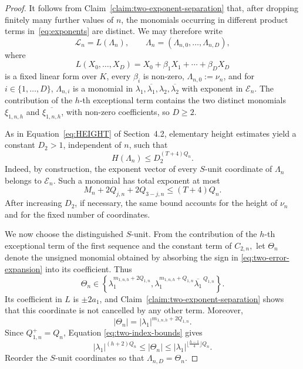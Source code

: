 \documentclass[a4paper,UKenglish,cleveref, autoref, thm-restate]{lipics-v2021}
\begin{document}
\begin{proof}
It follows from Claim~\ref{claim:two-exponent-separation} that, after dropping finitely many further
values of \(n\), the monomials occurring in different product terms in~\eqref{eq:exponents} are distinct. We may therefore
write
\begin{equation}\label{eq:two-linear-form}
  \mathcal L_n=L(\Lambda_n),
  \qquad
  \Lambda_n=(\Lambda_{n,0},\ldots,\Lambda_{n,D}),
\end{equation}
where
\[
  L(X_0,\ldots,X_D)
  =
  X_0+\beta_1X_1+\cdots+\beta_DX_D
\]
is a fixed linear form over \(K\), every \(\beta_i\) is non-zero, \(\Lambda_{n,0}:=\nu_n\), and
for $i\in\{1,\ldots,D\}$, \(\Lambda_{n,i}\) is a monomial in
\(
  \lambda_1,\overline{\lambda_1},
  \lambda_2,\overline{\lambda_2}
\)
with exponent in $\mathcal E_n$.
The contribution of the $h$-th exceptional term contains the two
distinct monomials $\xi_{1,n,h}$ and
$\overline{\xi_{1,n,h}}$, with non-zero coefficients, so $D\geq 2$.


As in Equation~\eqref{eq:HEIGHT} of Section~4.2, elementary height estimates yield a
constant \(D_2>1\), independent of \(n\), such that
\begin{equation}\label{eq:two-height-estimate}
  H(\Lambda_n)
  \le
  D_2^{(T+4)Q_n}.
\end{equation}
Indeed, by construction, the exponent vector of every $S$-unit
coordinate of $\Lambda_n$ belongs to $\mathcal E_n$.  Such a monomial has total exponent at most 
\[
  M_n+2Q_{j,n}+2Q_{3-j,n}
  \le
  (T+4)Q_n.
\]
After increasing \(D_2\), if necessary, the same bound accounts for
the height of \(\nu_n\) and for the fixed number of coordinates.

We now choose the distinguished \(S\)-unit. From the contribution of
the \(h\)-th exceptional term of the first sequence and the constant
term of
\(C_{2,n},
\)
let \(\Theta_n\) denote the unsigned monomial obtained by absorbing the
sign in \eqref{eq:two-error-expansion} into its coefficient. Thus
\begin{equation}\label{eq:two-theta-type}
  \Theta_n
  \in
  \left\{
    \lambda_1^{m_{1,n,h}+2Q_{1,n}},
    \lambda_1^{m_{1,n,h}+Q_{1,n}}
    \overline{\lambda_1}^{\,Q_{1,n}}
  \right\}.
\end{equation}
Its coefficient in \(L\) is \(\pm2a_1\), and Claim~\ref{claim:two-exponent-separation}
shows that this coordinate is not cancelled by any other term.
Moreover,
\[
  |\Theta_n|
  =
  |\lambda_1|^{m_{1,n,h}+2Q_{1,n}}.
\]
Since \(Q_{1,n}^+=Q_n\), Equation
\eqref{eq:two-index-bounds}  gives
\begin{equation}\label{eq:two-theta-bounds}
  |\lambda_1|^{(h+2)Q_n}
  \le
  |\Theta_n|
  \le
  |\lambda_1|^{\lfloor \frac{h-1}{4} \rfloor Q_n}.
\end{equation}
Reorder the \(S\)-unit coordinates so that
\(
  \Lambda_{n,D}=\Theta_n
\).


\end{proof}
\end{document}
